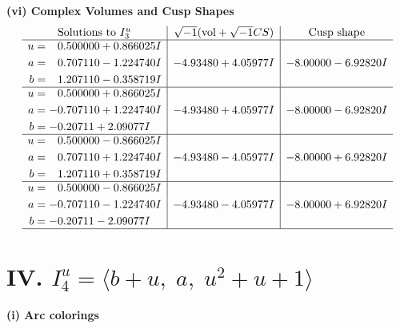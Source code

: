 \documentclass[1p]{elsarticle_modified}
\theoremstyle{definition}
\newcommand{\I}{\sqrt{-1}}
\begin{document}
\newpage\flushleft \textbf{(vi) Complex Volumes and Cusp Shapes}
$$\begin{array}{c|c|c}  
\text{Solutions to }I^u_{3}& \I (\text{vol} + \sqrt{-1}CS) & \text{Cusp shape}\\
 \hline 
\begin{aligned}
u &= \phantom{-}0.500000 + 0.866025 I \\
a &= \phantom{-}0.707110 - 1.224740 I \\
b &= \phantom{-}1.207110 - 0.358719 I\end{aligned}
 & -4.93480 + 4.05977 I & -8.00000 - 6.92820 I \\ \hline\begin{aligned}
u &= \phantom{-}0.500000 + 0.866025 I \\
a &= -0.707110 + 1.224740 I \\
b &= -0.20711 + 2.09077 I\end{aligned}
 & -4.93480 + 4.05977 I & -8.00000 - 6.92820 I \\ \hline\begin{aligned}
u &= \phantom{-}0.500000 - 0.866025 I \\
a &= \phantom{-}0.707110 + 1.224740 I \\
b &= \phantom{-}1.207110 + 0.358719 I\end{aligned}
 & -4.93480 - 4.05977 I & -8.00000 + 6.92820 I \\ \hline\begin{aligned}
u &= \phantom{-}0.500000 - 0.866025 I \\
a &= -0.707110 - 1.224740 I \\
b &= -0.20711 - 2.09077 I\end{aligned}
 & -4.93480 - 4.05977 I & -8.00000 + 6.92820 I\\
 \hline 
 \end{array}$$\newpage\newpage\renewcommand{\arraystretch}{1}
\centering \section*{IV. $I^u_{4}= \langle b+u,\;a,\;u^2+u+1 \rangle$}
\flushleft \textbf{(i) Arc colorings}\\
\end{document}
